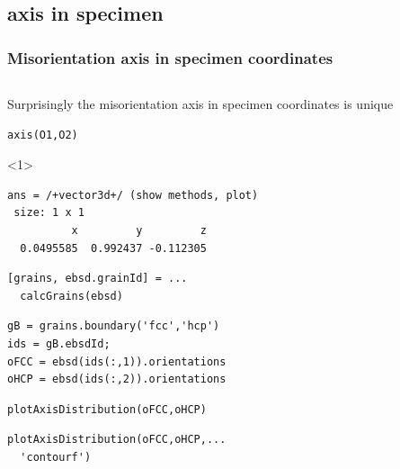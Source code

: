 \documentclass[compress]{beamer}
\begin{document}
\subsection*{axis in specimen}

\begin{frame}[fragile]
  \frametitle{Misorientation axis in specimen coordinates}

  \vspace{-.5cm}
  \begin{overlayarea}{\textwidth}{\textheight}

\begin{columns}

  \begin{column}{0.67\textwidth}


    Surprisingly the misorientation axis in specimen coordinates is unique
\begin{lstlisting}[style=input]
axis(O1,O2)
\end{lstlisting}

\begin{onlyenv}<1>
  \vspace{-.3cm}
\begin{lstlisting}[style=output]
ans = /+vector3d+/ (show methods, plot)
 size: 1 x 1
          x         y         z
  0.0495585  0.992437 -0.112305
\end{lstlisting}
\end{onlyenv}

\pause

\begin{lstlisting}[style=input]
[grains, ebsd.grainId] = ...
  calcGrains(ebsd)
\end{lstlisting}

\pause

\begin{lstlisting}[style=input]
gB = grains.boundary('fcc','hcp')
ids = gB.ebsdId;
oFCC = ebsd(ids(:,1)).orientations
oHCP = ebsd(ids(:,2)).orientations
\end{lstlisting}

\pause

\begin{lstlisting}[style=input]
plotAxisDistribution(oFCC,oHCP)
\end{lstlisting}

\pause

\begin{lstlisting}[style=input]
plotAxisDistribution(oFCC,oHCP,...
  'contourf')
\end{lstlisting}


\end{column}
\end{columns}
\end{overlayarea}
\end{frame}
\end{document}
